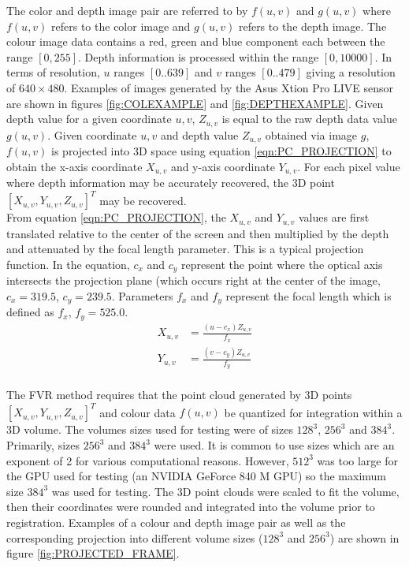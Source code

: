 The color and depth image pair are referred to by $f(u,v)$ and $g(u,v)$ where $f(u,v)$ refers to the color image and $g(u,v)$ refers to the depth image. The colour image data contains a red, green and blue component each between the range $[0,255]$. Depth information is processed within the range $[0,10000]$. In terms of resolution, $u$ ranges $[0..639]$ and $v$ ranges $[0..479]$ giving a resolution of $640 \times 480$. Examples of images generated by the Asus Xtion Pro LIVE sensor are shown in figures \ref{fig:COLEXAMPLE} and \ref{fig:DEPTHEXAMPLE}. Given depth value for a given coordinate $u,v$, $Z_{u,v}$ is equal to the raw depth data value $g(u,v)$. Given coordinate $u,v$ and depth value $Z_{u,v}$ obtained via image $g$, $f(u,v)$ is projected into 3D space using equation \ref{eqn:PC_PROJECTION} to obtain the x-axis coordinate $X_{u,v}$ and y-axis coordinate $Y_{u,v}$. For each pixel value where depth information may be accurately recovered, the 3D point $[X_{u,v}, Y_{u,v}, Z_{u,v}]^T$ may be recovered. \\

From equation \ref{eqn:PC_PROJECTION}, the $X_{u,v}$ and $Y_{u,v}$ values are first translated relative to the center of the screen and then multiplied by the depth and attenuated by the focal length parameter. This is a typical projection function. In the equation, $c_x$ and $c_y$ represent the point where the optical axis intersects the projection plane (which occurs right at the center of the image, $c_x = 319.5$, $c_y = 239.5$. Parameters $f_x$ and $f_y$ represent the focal length which is defined as $f_x$, $f_y = 525.0$. \\


\begin{equation} \label{eqn:PC_PROJECTION}
\begin{split}
X_{u,v} & = \frac{(u - c_x)Z_{u,v}}{f_x} \\
Y_{u,v} & = \frac{(v - c_y)Z_{u,v}}{f_y} \\
\end{split}
\end{equation}

The FVR method requires that the point cloud generated by 3D points $[X_{u,v}, Y_{u,v}, Z_{u,v}]^T$ and colour data $f(u,v)$ be quantized for integration within a 3D volume. The volumes sizes used for testing were of sizes $128^3$, $256^3$ and $384^3$. Primarily, sizes $256^3$ and $384^3$ were used. It is common to use sizes which are an exponent of 2 for various computational reasons. However, $512^3$ was too large for the GPU used for testing (an NVIDIA GeForce 840 M GPU) so the maximum size $384^3$ was used for testing. The 3D point clouds were scaled to fit the volume, then their coordinates were rounded and integrated into the volume prior to registration. Examples of a colour and depth image pair as well as the corresponding projection into different volume sizes ($128^3$ and $256^3$) are shown in figure \ref{fig:PROJECTED_FRAME}.  \\

